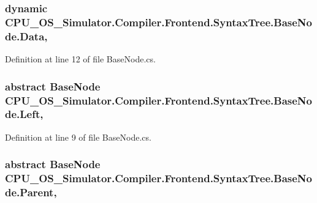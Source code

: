 \subsubsection[{Data}]{\setlength{\rightskip}{0pt plus 5cm}dynamic C\+P\+U\+\_\+\+O\+S\+\_\+\+Simulator.\+Compiler.\+Frontend.\+Syntax\+Tree.\+Base\+Node.\+Data\hspace{0.3cm}{\ttfamily [get]}, {\ttfamily [set]}}\label{class_c_p_u___o_s___simulator_1_1_compiler_1_1_frontend_1_1_syntax_tree_1_1_base_node_ad7f198ee35d784abb122d510ec17c59a}


Definition at line 12 of file Base\+Node.\+cs.

\hypertarget{class_c_p_u___o_s___simulator_1_1_compiler_1_1_frontend_1_1_syntax_tree_1_1_base_node_aff39b054b8bcc205583285c1dccfcbf3}{}
\subsubsection[{Left}]{\setlength{\rightskip}{0pt plus 5cm}abstract {\bf Base\+Node} C\+P\+U\+\_\+\+O\+S\+\_\+\+Simulator.\+Compiler.\+Frontend.\+Syntax\+Tree.\+Base\+Node.\+Left\hspace{0.3cm}{\ttfamily [get]}, {\ttfamily [set]}}\label{class_c_p_u___o_s___simulator_1_1_compiler_1_1_frontend_1_1_syntax_tree_1_1_base_node_aff39b054b8bcc205583285c1dccfcbf3}


Definition at line 9 of file Base\+Node.\+cs.

\hypertarget{class_c_p_u___o_s___simulator_1_1_compiler_1_1_frontend_1_1_syntax_tree_1_1_base_node_a218b40fedda0f7d47f1985f8396a0c48}{}
\subsubsection[{Parent}]{\setlength{\rightskip}{0pt plus 5cm}abstract {\bf Base\+Node} C\+P\+U\+\_\+\+O\+S\+\_\+\+Simulator.\+Compiler.\+Frontend.\+Syntax\+Tree.\+Base\+Node.\+Parent\hspace{0.3cm}{\ttfamily [get]}, {\ttfamily [set]}}\label{class_c_p_u___o_s___simulator_1_1_compiler_1_1_frontend_1_1_syntax_tree_1_1_base_node_a218b40fedda0f7d47f1985f8396a0c48}


